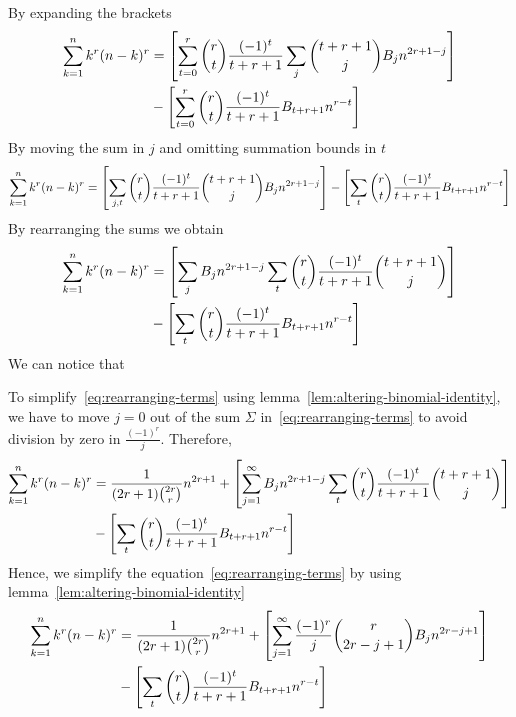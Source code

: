 By expanding the brackets
\begin{align*}
    \sum_{k=1}^{n} k^{r} (n-k)^{r}
    &= \left[ \sum_{t=0}^{r} \binom{r}{t} \frac{(-1)^t}{t+r+1} \sum_{j} \binom{t+r+1}{j} {B}\sb{j} n^{2r+1-j}  \right] \\
    &- \left[ \sum_{t=0}^{r} \binom{r}{t} \frac{(-1)^t}{t+r+1} {B}\sb{t+r+1} n^{r-t} \right]
\end{align*}
By moving the sum in $j$ and omitting summation bounds in $t$
\begin{align*}
    \sum_{k=1}^{n} k^{r} (n-k)^{r}
    = \left[ \sum_{j, t} \binom{r}{t} \frac{(-1)^t}{t+r+1} \binom{t+r+1}{j} {B}\sb{j} n^{2r+1-j}  \right]
    - \left[ \sum_{t} \binom{r}{t} \frac{(-1)^t}{t+r+1} {B}\sb{t+r+1} n^{r-t} \right]
\end{align*}
By rearranging the sums we obtain
\begin{align}
    \label{eq:rearranging-terms}
    \sum_{k=1}^{n} k^{r} (n-k)^{r}
    &= \left[ \sum_{j} {B}\sb{j} n^{2r+1-j} \sum_{t} \binom{r}{t} \frac{(-1)^t}{t+r+1} \binom{t+r+1}{j}  \right] \\
    &- \left[ \sum_{t} \binom{r}{t} \frac{(-1)^t}{t+r+1} {B}\sb{t+r+1} n^{r-t} \right] \nonumber
\end{align}
We can notice that

To simplify~\eqref{eq:rearranging-terms} using lemma~\eqref{lem:altering-binomial-identity}, we have to move $j=0$ out of
the sum $\Sigma$
in~\eqref{eq:rearranging-terms} to avoid division by zero in $\frac{(-1)^r}{j}$.
Therefore,
\begin{equation*}
    \begin{split}
        \sum_{k=1}^{n} k^{r} (n-k)^{r}
        &= \frac{1}{(2r+1) \binom{2r}r} n^{2r+1}
        + \left[ \sum_{j = 1}^{\infty} {B}\sb{j} n^{2r+1-j} \sum_{t} \binom{r}{t} \frac{(-1)^t}{t+r+1} \binom{t+r+1}{j} \right] \\
        &- \left[ \sum_{t} \binom{r}{t} \frac{(-1)^t}{t+r+1} {B}\sb{t+r+1} n^{r-t} \right]
    \end{split}
\end{equation*}
Hence, we simplify the equation~\eqref{eq:rearranging-terms} by using lemma~\eqref{lem:altering-binomial-identity}
\begin{equation*}
    \begin{split}
        \sum_{k=1}^{n} k^{r} (n-k)^{r}
        &= \frac{1}{(2r+1) \binom{2r}r} n^{2r+1}
        + \left[ \sum_{j=1}^{\infty} \frac{(-1)^r}{j} \binom{r}{2r-j+1} {B}\sb{j} n^{2r-j+1} \right] \\
        &- \left[ \sum_{t} \binom{r}{t} \frac{(-1)^t}{t+r+1} {B}\sb{t+r+1} n^{r-t} \right]
    \end{split}
\end{equation*}
